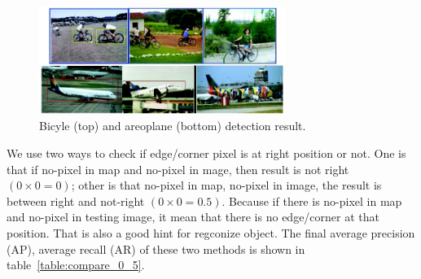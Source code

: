 \begin{figure}[ht]
  \centering
  \includegraphics[width=3.15in]{images/bicycle_plane_example.jpg}
  \caption{Bicyle (top) and areoplane (bottom) detection result.}
  \label{fig:bicyle_plane_example}
\end{figure}
We use two ways to check if edge/corner pixel is at right position or
not. One is that if no-pixel in map and no-pixel in mage, then result
is not right $(0\times 0=0)$; other is that no-pixel in map, no-pixel in image,
the result is between right and not-right $(0\times 0=0.5)$. Because if there
is no-pixel in map and no-pixel in testing image, it mean that there
is no edge/corner at that position. That is also a good hint for
regconize object. The final average precision (AP), average recall
(AR) of these two methods is shown in table~\ref{table:compare_0_5}.
